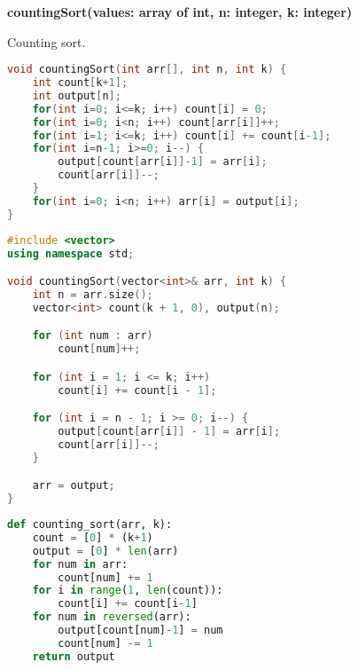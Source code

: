 \begin{center}
\begin{minipage}{.9\linewidth}
\begin{algorithm}[H]
\DontPrintSemicolon
\textbf{countingSort(values: array of int, n: integer, k: integer)}

\caption{Counting sort.}
\label{lab:alg-countingSort}
\end{algorithm}
\end{minipage}
\end{center}

\vspace{1em}

\begin{lstlisting}[language=C,caption={Counting sort em C},captionpos=t]
void countingSort(int arr[], int n, int k) {
    int count[k+1];
    int output[n];
    for(int i=0; i<=k; i++) count[i] = 0;
    for(int i=0; i<n; i++) count[arr[i]]++;
    for(int i=1; i<=k; i++) count[i] += count[i-1];
    for(int i=n-1; i>=0; i--) {
        output[count[arr[i]]-1] = arr[i];
        count[arr[i]]--;
    }
    for(int i=0; i<n; i++) arr[i] = output[i];
}
\end{lstlisting}

\begin{lstlisting}[language=C++,caption={Counting sort em C++},captionpos=t]
#include <vector>
using namespace std;

void countingSort(vector<int>& arr, int k) {
    int n = arr.size();
    vector<int> count(k + 1, 0), output(n);

    for (int num : arr)
        count[num]++;

    for (int i = 1; i <= k; i++)
        count[i] += count[i - 1];

    for (int i = n - 1; i >= 0; i--) {
        output[count[arr[i]] - 1] = arr[i];
        count[arr[i]]--;
    }

    arr = output;
}
\end{lstlisting}

\begin{lstlisting}[language=Python,caption={Counting sort em Python},captionpos=t]
def counting_sort(arr, k):
    count = [0] * (k+1)
    output = [0] * len(arr)
    for num in arr:
        count[num] += 1
    for i in range(1, len(count)):
        count[i] += count[i-1]
    for num in reversed(arr):
        output[count[num]-1] = num
        count[num] -= 1
    return output
\end{lstlisting}

